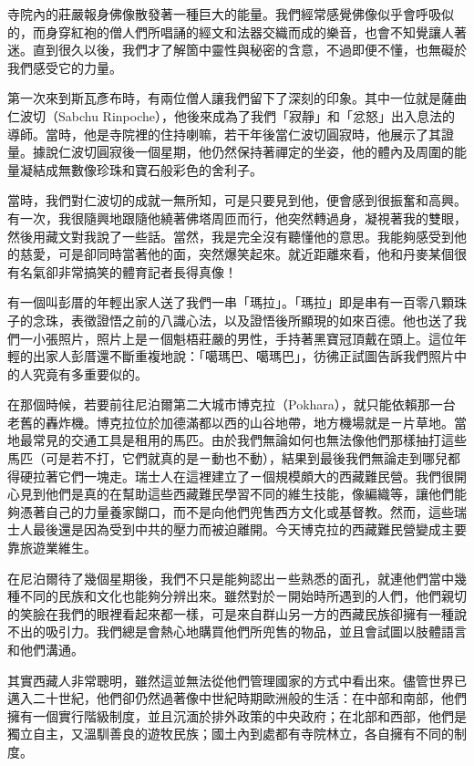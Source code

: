 寺院內的莊嚴報身佛像散發著一種巨大的能量。我們經常感覺佛像似乎會呼吸似的，而身穿紅袍的僧人們所唱誦的經文和法器交織而成的樂音，也會不知覺讓人著迷。直到很久以後，我們才了解箇中靈性與秘密的含意，不過即便不懂，也無礙於我們感受它的力量。

第一次來到斯瓦彥布時，有兩位僧人讓我們留下了深刻的印象。其中一位就是薩曲仁波切（Sabchu
Rinpoche），他後來成為了我們「寂靜」和「忿怒」出入息法的導師。當時，他是寺院裡的住持喇嘛，若干年後當仁波切圓寂時，他展示了其證量。據說仁波切圓寂後一個星期，他仍然保持著禪定的坐姿，他的體內及周圍的能量凝結成無數像珍珠和寶石般彩色的舍利子。

當時，我們對仁波切的成就一無所知，可是只要見到他，便會感到很振奮和高興。有一次，我很隨興地跟隨他繞著佛塔周匝而行，他突然轉過身，凝視著我的雙眼，然後用藏文對我說了一些話。當然，我是完全沒有聽懂他的意思。我能夠感受到他的慈愛，可是卻同時當著他的面，突然爆笑起來。就近距離來看，他和丹麥某個很有名氣卻非常搞笑的體育記者長得真像！

有一個叫彭厝的年輕出家人送了我們一串「瑪拉」。「瑪拉」即是串有一百零八顆珠子的念珠，表徵證悟之前的八識心法，以及證悟後所顯現的如來百德。他也送了我們一小張照片，照片上是ㄧ個魁梧莊嚴的男性，手持著黑寶冠頂戴在頭上。這位年輕的出家人彭厝還不斷重複地說：「噶瑪巴、噶瑪巴」，彷彿正試圖告訴我們照片中的人究竟有多重要似的。

在那個時候，若要前往尼泊爾第二大城市博克拉（Pokhara），就只能依賴那一台老舊的轟炸機。博克拉位於加德滿都以西的山谷地帶，地方機場就是ㄧ片草地。當地最常見的交通工具是租用的馬匹。由於我們無論如何也無法像他們那樣抽打這些馬匹（可是若不打，它們就真的是ㄧ動也不動），結果到最後我們無論走到哪兒都得硬拉著它們一塊走。瑞士人在這裡建立了ㄧ個規模頗大的西藏難民營。我們很開心見到他們是真的在幫助這些西藏難民學習不同的維生技能，像編織等，讓他們能夠憑著自己的力量養家餬口，而不是向他們兜售西方文化或基督教。然而，這些瑞士人最後還是因為受到中共的壓力而被迫離開。今天博克拉的西藏難民營變成主要靠旅遊業維生。

在尼泊爾待了幾個星期後，我們不只是能夠認出ㄧ些熟悉的面孔，就連他們當中幾種不同的民族和文化也能夠分辨出來。雖然對於ㄧ開始時所遇到的人們，他們親切的笑臉在我們的眼裡看起來都一樣，可是來自群山另一方的西藏民族卻擁有一種說不出的吸引力。我們總是會熱心地購買他們所兜售的物品，並且會試圖以肢體語言和他們溝通。

其實西藏人非常聰明，雖然這並無法從他們管理國家的方式中看出來。儘管世界已邁入二十世紀，他們卻仍然過著像中世紀時期歐洲般的生活：在中部和南部，他們擁有一個實行階級制度，並且沉湎於排外政策的中央政府；在北部和西部，他們是獨立自主，又溫馴善良的遊牧民族；國土內到處都有寺院林立，各自擁有不同的制度。

